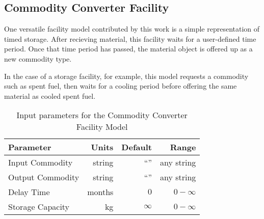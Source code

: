 \subsection{Commodity Converter Facility}

One versatile facility model contributed by this work is a simple 
representation of timed storage. After recieving material, this facility 
waits for a user-defined time period. Once that time period has passed, the 
material object is offered up as a new commodity type. 

In the case of a storage facility, for example, this model requests a commodity 
such as spent fuel, then waits for a cooling period before offering the same 
material as cooled spent fuel.

\begin{table}[h!]
\centering
\begin{tabular}{|l|r|r|r|}
\hline
\textbf{Parameter} & \textbf{Units} & \textbf{Default} & \textbf{Range}\\
\hline
Input Commodity& string & ``'' & any string\\
Output Commodity& string & ``'' & any string\\
Delay Time & months & $0$ & $0-\infty$\\
Storage Capacity & kg & $\infty$ &$0-\infty$ \\
\hline
\end{tabular}
\caption{Input parameters for the Commodity Converter Facility Model}
\label{tab:commodconverter}
\end{table}

